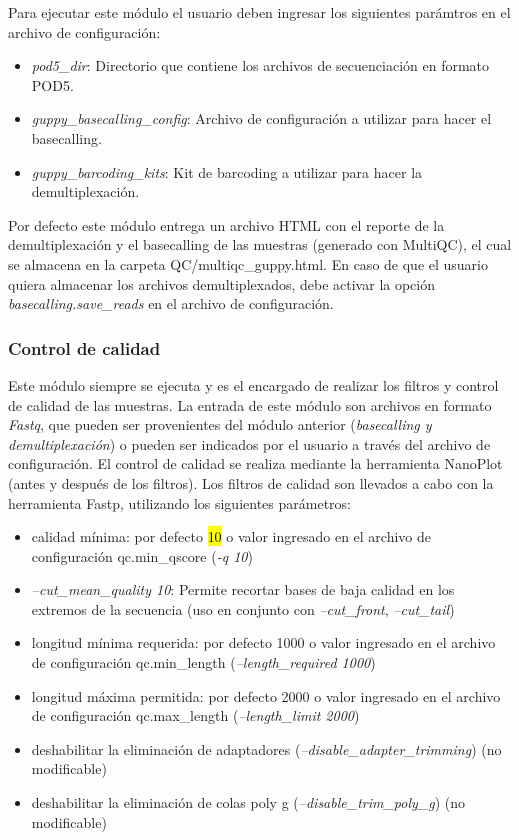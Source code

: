 Para ejecutar este módulo el usuario deben ingresar los siguientes parámtros en el archivo de configuración:
\begin{itemize}
    \item \textit{pod5\_dir}: Directorio que contiene los archivos de secuenciación en formato POD5.
    \item \textit{guppy\_basecalling\_config}: Archivo de configuración a utilizar para hacer el basecalling.
    \item \textit{guppy\_barcoding\_kits}: Kit de barcoding a utilizar para hacer la demultiplexación.
\end{itemize} 

Por defecto este módulo entrega un archivo HTML con el reporte de la demultiplexación y el basecalling de las muestras (generado con MultiQC), el cual se almacena en la carpeta QC/multiqc\_guppy.html.
En caso de que el usuario quiera almacenar los archivos demultiplexados, debe activar la opción \textit{basecalling.save\_reads} en el archivo de configuración.


\subsubsection{Control de calidad}
Este módulo siempre se ejecuta y es el encargado de realizar los filtros y control de calidad de las muestras.
La entrada de este módulo son archivos en formato \textit{Fastq}, que pueden ser provenientes del módulo anterior (\textit{basecalling y demultiplexación}) o pueden ser indicados por el usuario a través del archivo de configuración.
El control de calidad se realiza mediante la herramienta NanoPlot (antes y después de los filtros).
Los filtros de calidad son llevados a cabo con la herramienta Fastp, utilizando los siguientes parámetros:
\begin{itemize}
    \item calidad mínima: por defecto \hl{10} o valor ingresado en el archivo de configuración qc.min\_qscore (\textit{-q 10})
    \item \textit{--cut\_mean\_quality 10}: Permite recortar bases de baja calidad en los extremos de la secuencia (uso en conjunto con \textit{--cut\_front}, \textit{--cut\_tail})
    \item longitud mínima requerida: por defecto 1000 o valor ingresado en el archivo de configuración qc.min\_length (\textit{--length\_required 1000}) 
    \item longitud máxima permitida: por defecto 2000 o valor ingresado en el archivo de configuración qc.max\_length (\textit{--length\_limit 2000})
    \item deshabilitar la eliminación de adaptadores (\textit{--disable\_adapter\_trimming}) (no modificable)
    \item deshabilitar la eliminación de colas poly g (\textit{--disable\_trim\_poly\_g}) (no modificable)
\end{itemize}

